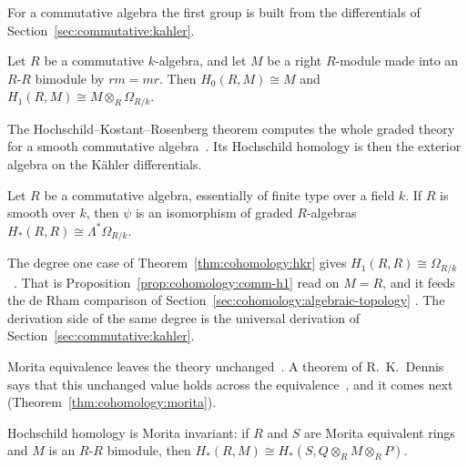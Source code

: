 For a commutative algebra the first group is built from the differentials of
Section~\ref{sec:commutative:kahler}.

\begin{proposition}\label{prop:cohomology:comm-h1}
Let $R$ be a commutative $k$-algebra, and let $M$ be a right $R$-module made into
an $R$-$R$ bimodule by $rm = mr$. Then $H_0(R, M) \cong M$ and
$H_1(R, M) \cong M \otimes_R \Omega_{R/k}$.
\end{proposition}

The Hochschild--Kostant--Rosenberg theorem computes the whole graded theory
for a smooth commutative algebra~\cite[Theorem~9.4.7,
pp.~322--323]{Weibel1994}. Its Hochschild homology is then the exterior
algebra on the Kähler differentials.

\begin{theorem}\label{thm:cohomology:hkr}
Let $R$ be a commutative algebra, essentially of finite type over a field $k$. If
$R$ is smooth over $k$, then $\psi$ is an isomorphism of graded $R$-algebras
$H_*(R, R) \cong \Lambda^* \Omega_{R/k}$.
\end{theorem}

The degree one case of Theorem~\ref{thm:cohomology:hkr} gives $H_1(R, R) \cong
\Omega_{R/k}$~\cite[Theorem~9.4.7, p.~322]{Weibel1994}. That is
Proposition~\ref{prop:cohomology:comm-h1} read on $M = R$, and it feeds the de
Rham comparison of Section~\ref{sec:cohomology:algebraic-topology}
\cite[Theorem~9.8.13, p.~351]{Weibel1994}. The derivation side of the same
degree is the universal derivation of Section~\ref{sec:commutative:kahler}.

Morita equivalence leaves the theory unchanged~\cite[Theorem~9.5.6,
p.~328]{Weibel1994}. A theorem of R.~K.~Dennis says that this unchanged value
holds across the equivalence~\cite[Theorem~9.5.6, p.~328]{Weibel1994}, and it
comes next (Theorem~\ref{thm:cohomology:morita}).

\begin{theorem}\label{thm:cohomology:morita}
Hochschild homology is Morita invariant: if $R$ and $S$ are Morita equivalent
rings and $M$ is an $R$-$R$ bimodule, then
$H_*(R, M) \cong H_*(S, Q \otimes_R M \otimes_R P)$.
\end{theorem}

